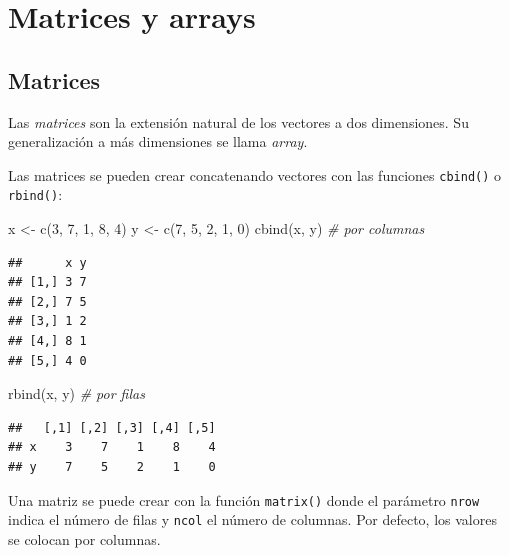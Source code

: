 \documentclass[
]{book}
\newenvironment{Shaded}{\begin{snugshade}}{\end{snugshade}}
\newcommand{\CommentTok}[1]{\textcolor[rgb]{0.56,0.35,0.01}{\textit{#1}}}
\newcommand{\DecValTok}[1]{\textcolor[rgb]{0.00,0.00,0.81}{#1}}
\newcommand{\FunctionTok}[1]{\textcolor[rgb]{0.00,0.00,0.00}{#1}}
\newcommand{\NormalTok}[1]{#1}
\newcommand{\OtherTok}[1]{\textcolor[rgb]{0.56,0.35,0.01}{#1}}
\theoremstyle{break}
\theoremstyle{nonumberplain}
\begin{document}
\hypertarget{matrices-y-arrays}{%
\section{Matrices y arrays}\label{matrices-y-arrays}}

\hypertarget{matrices}{%
\subsection{Matrices}\label{matrices}}

Las \emph{matrices} son la extensión natural de los vectores a dos dimensiones.
Su generalización a más dimensiones se llama \emph{array}.

Las matrices se pueden crear concatenando vectores con las funciones \texttt{cbind()} o \texttt{rbind()}:

\begin{Shaded}
\begin{Highlighting}[]
\NormalTok{x }\OtherTok{\textless{}{-}} \FunctionTok{c}\NormalTok{(}\DecValTok{3}\NormalTok{, }\DecValTok{7}\NormalTok{, }\DecValTok{1}\NormalTok{, }\DecValTok{8}\NormalTok{, }\DecValTok{4}\NormalTok{)}
\NormalTok{y }\OtherTok{\textless{}{-}} \FunctionTok{c}\NormalTok{(}\DecValTok{7}\NormalTok{, }\DecValTok{5}\NormalTok{, }\DecValTok{2}\NormalTok{, }\DecValTok{1}\NormalTok{, }\DecValTok{0}\NormalTok{)}
\FunctionTok{cbind}\NormalTok{(x, y)  }\CommentTok{\# por columnas}
\end{Highlighting}
\end{Shaded}

\begin{verbatim}
##      x y
## [1,] 3 7
## [2,] 7 5
## [3,] 1 2
## [4,] 8 1
## [5,] 4 0
\end{verbatim}

\begin{Shaded}
\begin{Highlighting}[]
\FunctionTok{rbind}\NormalTok{(x, y)  }\CommentTok{\# por filas}
\end{Highlighting}
\end{Shaded}

\begin{verbatim}
##   [,1] [,2] [,3] [,4] [,5]
## x    3    7    1    8    4
## y    7    5    2    1    0
\end{verbatim}

Una matriz se puede crear con la función \texttt{matrix()} donde el parámetro \texttt{nrow} indica el número de filas y \texttt{ncol} el número de columnas.
Por defecto, los valores se colocan por columnas.
\end{document}
